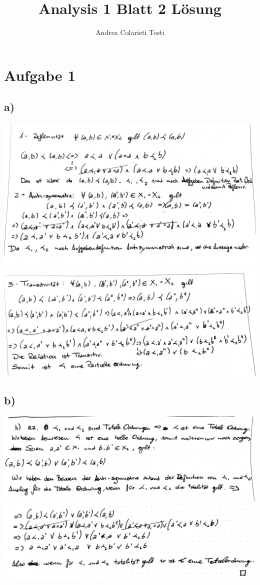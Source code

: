 \documentclass[12pt,a4paper,landscape]{article}
\author{Andrea Colarieti Tosti}
\title{Analysis 1 Blatt 2 Lösung}
\begin{document}
\maketitle \newpage
\section*{Aufgabe 1}
\subsection*{a)}
\includegraphics[scale=0.3]{AB2-1a_1.jpg} \newpage
\includegraphics[scale=0.3]{AB2-1a_2.jpg} 
\subsection*{b)}
\includegraphics[scale=0.3]{AB2-1b_1.jpg} \\
\includegraphics[scale=0.3]{AB2-1b_2.jpg} 
\end{document}
